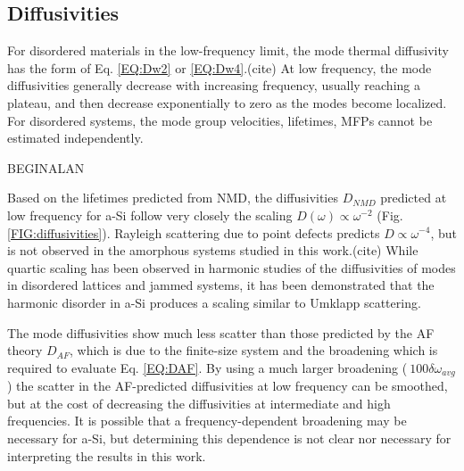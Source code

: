 \documentclass[aps,prb,onecolumn,preprint,superscriptaddress,footinbib,amsmath,amssymb,floatfix]{revtex4}
\begin{document}
\subsection{\label{S:Diffusivities}Diffusivities}

For disordered materials in the low-frequency limit, 
the mode thermal diffusivity 
has the form of Eq. \eqref{EQ:Dw2} or \eqref{EQ:Dw4}.(cite)  
At low frequency, the mode diffusivities 
generally decrease with increasing frequency, 
usually reaching a plateau, and then decrease exponentially 
to zero as the modes become localized.
\cite{sheng_heat_1991,feldman_thermal_1993,feldman_numerical_1999,
xu_energy_2009,vitelli_heat_2010,donadio_atomistic_2009,
beltukov_ioffe-regel_2013,larkin_predicting_2013}
For disordered systems, the mode group velocities, 
lifetimes, MFPs cannot be estimated independently.
\cite{allen_thermal_1993,feldman_thermal_1993,
feldman_numerical_1999,allen_evolution_1998,larkin_predicting_2013}

BEGINALAN

Based on the lifetimes predicted from NMD, the diffusivities 
$D_{NMD}$ predicted 
at low frequency for a-Si follow very closely the scaling 
$D(\omega) \propto \omega^{-2}$ (Fig. \ref{FIG:diffusivities}). 
Rayleigh 
scattering due to point defects predicts $D \propto \omega^{-4}$, 
but is not observed in the amorphous systems studied in this work.(cite) 
While quartic scaling has been 
observed in harmonic studies of the diffusivities of modes in 
disordered lattices and jammed systems,
\cite{sheng_heat_1991,xu_energy_2009,vitelli_heat_2010} 
it has been demonstrated that the harmonic disorder in a-Si 
produces a scaling similar to Umklapp scattering.
\cite{feldman_thermal_1993}

The mode diffusivities show much 
less 
scatter than those predicted by the AF theory $D_{AF}$, which is due to 
the finite-size system and the broadening which is required to evaluate 
Eq. \eqref{EQ:DAF}.\cite{feldman_thermal_1993} By using a much larger 
broadening ($~100\delta\omega_{avg}$) the scatter in the AF-predicted 
diffusivities at low frequency can be smoothed, but at the cost of 
decreasing the diffusivities at intermediate and high frequencies. 
It is possible that a frequency-dependent broadening may be necessary 
for a-Si, 
but determining this dependence is not clear nor necessary for 
interpreting the results in this work. 
\end{document}
